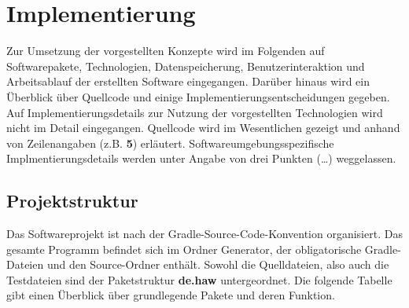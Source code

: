 
\chapter{Implementierung}

Zur Umsetzung der vorgestellten Konzepte wird im Folgenden auf Softwarepakete, Technologien, Datenspeicherung,
Benutzerinteraktion und Arbeitsablauf der erstellten Software eingegangen.
Darüber hinaus wird ein Überblick über Quellcode und einige Implementierungsentscheidungen gegeben.
Auf Implementierungsdetails zur Nutzung der vorgestellten Technologien wird nicht im Detail eingegangen.
Quellcode wird im Wesentlichen gezeigt und anhand von Zeilenangaben (z.B. \textbf{5}) erläutert.
Softwareumgebungsspezifische Implmentierungsdetails werden unter Angabe von drei Punkten (\ldots) weggelassen.

\section{Projektstruktur}
Das Softwareprojekt ist nach der Gradle-Source-Code-Konvention organisiert.
Das gesamte Programm befindet sich im Ordner Generator, der obligatorische Gradle-Dateien und den
Source-Ordner enthält.
Sowohl die Quelldateien, also auch die Testdateien sind der Paketstruktur \textbf{de.haw} untergeordnet.
Die folgende Tabelle gibt einen Überblick über grundlegende Pakete und deren Funktion.

